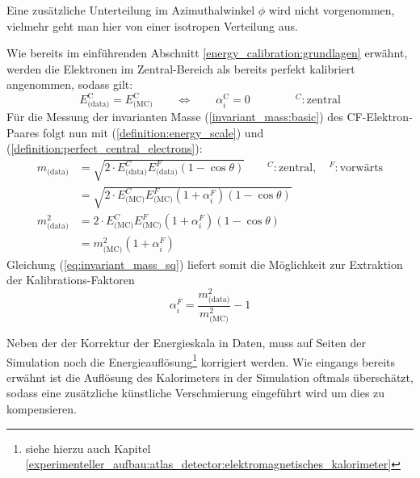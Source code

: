 Eine zusätzliche Unterteilung im Azimuthalwinkel $\phi$ wird nicht
vorgenommen, vielmehr geht man hier von einer isotropen Verteilung aus.
\newline

Wie bereits im einführenden Abschnitt \ref{energy_calibration:grundlagen}
erwähnt, werden die Elektronen im Zentral-Bereich als bereits perfekt
kalibriert angenommen, sodass gilt:
\begin{equation}
    \label{definition:perfect_central_electrons}
    E_\text{(data)}^\text{C} = E_\text{(MC)}^\text{C}
    \qquad \Longleftrightarrow \qquad
    \alpha_i^\text{C} = 0
    \qquad\qquad
    ^C : \text{zentral}
\end{equation}
Für die Messung der invarianten Masse (\ref{invariant_mass:basic}) des
\acs{CF}-Elektron-Paares folgt nun mit (\ref{definition:energy_scale}) und
(\ref{definition:perfect_central_electrons}):
\begin{align}
    m_\text{(data)}   &= \sqrt{ 2 \cdot E^C_\text{(data)} E^F_{\text{(data)}}
                         (1-\cos\theta)} 
                         \qquad ^C: \text{zentral}, \quad ^F: \text{vorwärts}
                         \nonumber \\[5pt]
                      &= \sqrt{ 2 \cdot E^C_\text{(MC)} E^F_{\text{(MC)}}
                         (1+\alpha^F_i)(1-\cos\theta)}
                         \nonumber \\[15pt]
    m^2_\text{(data)} &= 2 \cdot E^C_\text{(MC)} E^F_{\text{(MC)}}
                         (1+\alpha^F_i)(1-\cos\theta)
                         \nonumber \\[5pt]
                      &= m^2_\text{(MC)} (1+\alpha^F_i)
                         \label{eq:invariant_mass_sq}
\end{align}
Gleichung (\ref{eq:invariant_mass_sq}) liefert somit die Möglichkeit zur
Extraktion der Kalibrations-Faktoren
\begin{equation}
    \label{eq:extraction_alpha}
    \alpha_i^F = \frac{m^2_\text{(data)}}{m^2_\text{(MC)}} - 1
\end{equation}

Neben der der Korrektur der Energieskala in Daten, muss auf Seiten der
Simulation noch die Energieauflösung\footnote{siehe hierzu auch Kapitel
\ref{experimenteller_aufbau:atlas_detector:elektromagnetisches_kalorimeter}}
korrigiert werden. Wie eingangs bereits erwähnt ist die Auflösung des
Kalorimeters in der Simulation oftmals überschätzt, sodass eine zusätzliche
künstliche Verschmierung eingeführt wird um dies zu kompensieren.

